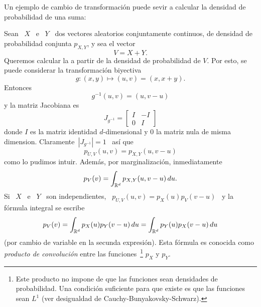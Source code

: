 Un ejemplo de  cambio de transformaci\'on puede sevir a  calcular la densidad de
probabilidad de una suma:
%
\begin{ejemplo}
\label{Ej:MP:Suma}
%
  Sean \  $X$ \ e  \ $Y$ \  dos vectores aleatorios conjuntamente  continuos, de
  densidad de  probabilidad conjunta $p_{X,Y}$,  y sea el  vector \[V = X  + Y.\]
  Queremos calcular la a partir de la densidad de probabilidad de $V$.  Por esto,
  se puede considerar la transformaci\'on biyectiva
  \[
  g: (x,y) \mapsto (u,v) = (x,x+y).
  \]
  Entonces
  \[
  g^{-1}(u,v) = (u,v-u)
  \]
  y la matriz Jacobiana es
  \[
  J_{g^{-1}} = \begin{bmatrix} I & -I \\ 0 & I \end{bmatrix}
  \]
  donde $I$ es la matriz identidad $d$-dimensional y $0$ la matriz nula de misma
  dimension. Claramente\ $\left| J_{g^{-1}} \right| = 1$ \ as\'i que
  \[
  p_{U,V}(u,v) = p_{X,Y}(u,v-u)
  \]
  como lo pudimos intuir. Adem\'as, por marginalizaci\'on, inmediatamente
  \[
  p_V(v) = \int_{\mathbb{R}^d} p_{X,Y}(u,v-u) \, du.
  \]
  Si \ $X$ \ e \ $Y$  \ son independientes, \ $p_{U,V}(u,v) = p_X(u) p_V(v-u)$ \
  y la f\'ormula integral se escribe
  \[
  p_V(v) = \int_{\mathbb{R}^d} p_X(u) p_Y(v-u) \, du = \int_{\mathbb{R}^d} p_Y(u) p_X(v-u)
  \, du
  \]
  (por  cambio  de variable  en  la  secunda  expresi\'on).  Esta  f\'ormula  es
  conocida    como     {\it    producto    de     convoluci\'on}    entre    las
  funciones~\footnote{Este  producto  no  impone   de  que  las  funciones  sean
    densidades de  probabilidad.  Una condici\'on suficiente para  que existe es
    que     las     funciones     sean     $L^1$     (ver     desigualdad     de
    Cauchy-Bunyakovsky-Schwarz).} $p_X$ y $p_Y$.
\end{ejemplo}



